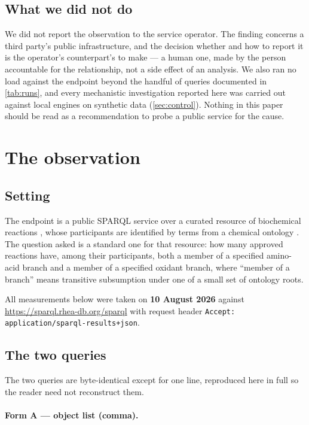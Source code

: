 \documentclass[11pt,a4paper]{article}
\theoremstyle{plain}
\theoremstyle{definition}
\theoremstyle{remark}
\begin{document}
\subsection{What we did not do}
\label{sec:notdone}

We did not report the observation to the service operator. The finding concerns
a third party's public infrastructure, and the decision whether and how to
report it is the operator's counterpart's to make --- a human one, made by the
person accountable for the relationship, not a side effect of an analysis. We
also ran no load against the endpoint beyond the handful of queries documented
in \cref{tab:runs}, and every mechanistic investigation reported here was
carried out against local engines on synthetic data
(\cref{sec:control}). Nothing in this paper should be read as a recommendation
to probe a public service for the cause.

\section{The observation}
\label{sec:observation}

\subsection{Setting}

The endpoint is a public SPARQL service over a curated resource of biochemical
reactions \citep{Alcantara2012,Bansal2022}, whose participants are identified by
terms from a chemical ontology \citep{Hastings2016}. The question asked is a
standard one for that resource: how many approved reactions have, among their
participants, both a member of a specified amino-acid branch and a member of a
specified oxidant branch, where ``member of a branch'' means transitive
subsumption under one of a small set of ontology roots.

All measurements below were taken on \textbf{10 August 2026} against
\url{https://sparql.rhea-db.org/sparql} with request header
\texttt{Accept: application/sparql-results+json}.

\subsection{The two queries}

The two queries are byte-identical except for one line, reproduced here in full
so the reader need not reconstruct them.

\paragraph{Form A --- object list (comma).}
\end{document}
